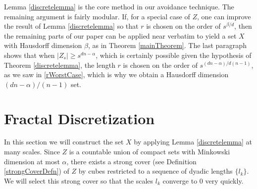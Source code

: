 \begin{remark}
	Lemma \ref{discretelemma} is the core method in our avoidance technique. The remaining argument is fairly modular. If, for a special case of $Z$, one can improve the result of Lemma \ref{discretelemma} so that $r$ is chosen on the order of $s^{\beta/d}$, then the remaining parts of our paper can be applied near verbatim to yield a set $X$ with Hausdorff dimension $\beta$, as in Theorem \ref{mainTheorem}. The last paragraph shows that when $|Z_s| \geq s^{dn - \alpha}$, which is certainly possible given the hypothesis of Theorem \ref{discretelemma}, the length $r$ is chosen on the order of $s^{(dn-\alpha)/d(n-1)}$, as we saw in \eqref{rWorstCase}, which is why we obtain a Hausdorff dimension $(dn - \alpha)/(n-1)$ set.
\end{remark}










\section{Fractal Discretization}\label{discretizationsection}
In this section we will construct the set $X$ by applying Lemma \ref{discretelemma} at many scales. Since $Z$ is a countable union of compact sets with Minkowski dimension at most $\alpha$, there exists a strong cover (see Definition \ref{strongCoverDefn}) of $Z$ by cubes restricted to a sequence of dyadic lengths $\{ l_k \}$. We will select this strong cover so that the scales $l_k$ converge to 0 very quickly.

